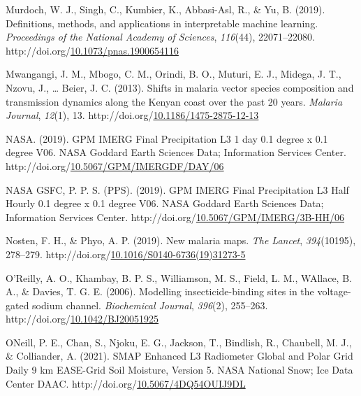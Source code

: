 \documentclass[12pt,twoside]{reedthesis}
\newlength{\cslhangindent}
\newenvironment{CSLReferences}[2] %
 {%
  \setlength{\parindent}{0pt}
  \ifodd #1 \everypar{\setlength{\hangindent}{\cslhangindent}}\ignorespaces\fi
  \ifnum #2 > 0
  \setlength{\parskip}{#2\baselineskip}
  \fi
 }%
 {}
\begin{document}
\begin{CSLReferences}{1}{0}
\leavevmode{}%
Murdoch, W. J., Singh, C., Kumbier, K., Abbasi-Asl, R., \& Yu, B. (2019). Definitions, methods, and applications in interpretable machine learning. \emph{Proceedings of the National Academy of Sciences}, \emph{116}(44), 22071--22080. http://doi.org/\href{https://doi.org/10.1073/pnas.1900654116}{10.1073/pnas.1900654116}

\leavevmode{}%
Mwangangi, J. M., Mbogo, C. M., Orindi, B. O., Muturi, E. J., Midega, J. T., Nzovu, J., \ldots{} Beier, J. C. (2013). Shifts in malaria vector species composition and transmission dynamics along the {Kenyan} coast over the past 20 years. \emph{Malaria Journal}, \emph{12}(1), 13. http://doi.org/\href{https://doi.org/10.1186/1475-2875-12-13}{10.1186/1475-2875-12-13}

\leavevmode{}%
NASA. (2019). {GPM} {IMERG} {Final} {Precipitation} {L3} 1 day 0.1 degree x 0.1 degree {V06}. NASA Goddard Earth Sciences Data; Information Services Center. http://doi.org/\href{https://doi.org/10.5067/GPM/IMERGDF/DAY/06}{10.5067/GPM/IMERGDF/DAY/06}

\leavevmode{}%
NASA GSFC, P. P. S. (PPS). (2019). {GPM} {IMERG} {Final} {Precipitation} {L3} {Half} {Hourly} 0.1 degree x 0.1 degree {V06}. NASA Goddard Earth Sciences Data; Information Services Center. http://doi.org/\href{https://doi.org/10.5067/GPM/IMERG/3B-HH/06}{10.5067/GPM/IMERG/3B-HH/06}

\leavevmode{}%
Nosten, F. H., \& Phyo, A. P. (2019). New malaria maps. \emph{The Lancet}, \emph{394}(10195), 278--279. http://doi.org/\href{https://doi.org/10.1016/S0140-6736(19)31273-5}{10.1016/S0140-6736(19)31273-5}

\leavevmode{}%
O'Reilly, A. O., Khambay, B. P. S., Williamson, M. S., Field, L. M., WAllace, B. A., \& Davies, T. G. E. (2006). Modelling insecticide-binding sites in the voltage-gated sodium channel. \emph{Biochemical Journal}, \emph{396}(2), 255--263. http://doi.org/\href{https://doi.org/10.1042/BJ20051925}{10.1042/BJ20051925}

\leavevmode{}%
ONeill, P. E., Chan, S., Njoku, E. G., Jackson, T., Bindlish, R., Chaubell, M. J., \& Colliander, A. (2021). {SMAP} {Enhanced} {L3} {Radiometer} {Global} and {Polar} {Grid} {Daily} 9 km {EASE}-{Grid} {Soil} {Moisture}, {Version} 5. NASA National Snow; Ice Data Center DAAC. http://doi.org/\href{https://doi.org/10.5067/4DQ54OUIJ9DL}{10.5067/4DQ54OUIJ9DL}


\end{CSLReferences}
\end{document}
